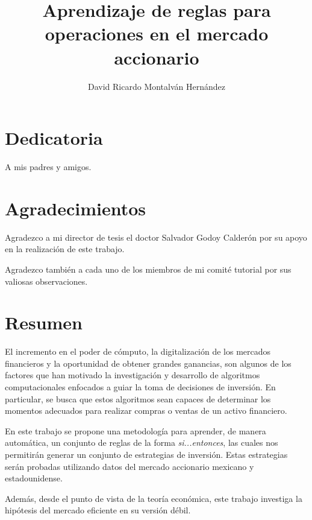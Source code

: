 \documentclass[12pt]{report}
\title{Aprendizaje de reglas para operaciones en el mercado accionario}
\date{}
\author{David Ricardo Montalván Hernández}
\theoremstyle{break}
\theoremstyle{break}
\begin{document}
\sloppy %
\maketitle
{} %

\chapter*{Dedicatoria}
A mis padres y amigos.

\chapter*{Agradecimientos}
Agradezco a mi director de tesis el doctor Salvador Godoy Calderón por su apoyo en la realización de este trabajo.

Agradezco también a cada uno de los miembros de mi comité tutorial por sus valiosas observaciones.

\renewcommand{\contentsname}{Contenido}
\tableofcontents
\renewcommand{\listfigurename}{Lista de figuras}
\listoffigures
\renewcommand{\listtablename}{Lista de tablas}
\renewcommand\tablename{Tabla}
\renewcommand{\bibname}{Referencias}
\renewcommand{\figurename}{Figura}
\renewcommand{\chaptername}{Capítulo}
\listoftables

\chapter*{Resumen}
El incremento en el poder de cómputo, la digitalización de los mercados financieros y la oportunidad de obtener grandes ganancias, son algunos de los factores que han motivado la investigación y desarrollo de algoritmos computacionales enfocados a guiar la toma de decisiones de inversión. En particular, se busca que estos algoritmos sean capaces de determinar los momentos adecuados para realizar compras o ventas de un activo financiero.

En este trabajo se propone una metodología para aprender, de manera automática, un conjunto de reglas de la forma \textit{si...entonces}, las cuales nos permitirán generar un conjunto de estrategias de inversión. Estas estrategias serán probadas utilizando datos del mercado accionario mexicano y estadounidense.

Además, desde el punto de vista de la teoría económica, este trabajo investiga la hipótesis del mercado eficiente en su versión débil.
\end{document}
